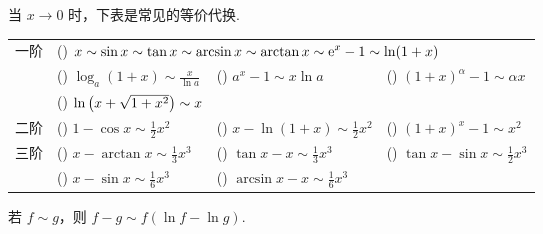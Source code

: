 当 $x\to0$ 时，下表是常见的等价代换.
\setcounter{magicrownumbers}{0}
\begin{table}[H]
    \centering
    \begin{tabular}{c l l l}
        \multirow{3}{*}{一阶} & \multicolumn{3}{l}{(\rownumber{}) $\displaystyle x\sim \sin x\sim \tan x\sim \arcsin x\sim \arctan x\sim \mathrm{e} ^x-1\sim \ln(1+x)$}                                                                                                                                                  \\
                              & (\rownumber{}) $\displaystyle \log_a(1+x)\sim\frac{x}{\ln a}$                                                                   & (\rownumber{}) $\displaystyle a^x-1\sim x\ln a$              & (\rownumber{}) $\displaystyle (1+x)^\alpha-1\sim \alpha x$                      \\
                              & (\rownumber{}) $\ln\qty(x+\sqrt{1+x^2})\sim x$                                                                                                                                                                                                                                   \\
        \midrule
        二阶                  & (\rownumber{}) $\displaystyle 1-\cos x\sim\frac{1}{2}x^2$                                                                       & (\rownumber{}) $\displaystyle x-\ln(1+x)\sim\frac{1}{2}x^2$  & (\rownumber{}) $\displaystyle (1+x)^x-1\sim x^2$                                \\
        \midrule
        \multirow{2}{*}{三阶} & (\rownumber{}) $\displaystyle x-\arctan x\sim\frac{1}{3}x^3$                                                                    & (\rownumber{}) $\displaystyle \tan x-x\sim\frac{1}{3}x^3$    & \multirow{2}{*}{(\rownumber{}) $\displaystyle \tan x-\sin x\sim\frac{1}{2}x^3$} \\
                              & (\rownumber{}) $\displaystyle x-\sin x\sim\frac{1}{6}x^3$                                                                       & (\rownumber{}) $\displaystyle \arcsin x-x\sim\frac{1}{6}x^3$ &                                                                                 \\
    \end{tabular}
\end{table}

\begin{theorem}[减法无穷小代换]
    若 $f\sim g$，则 $f-g\sim f(\ln f-\ln g)$.
    \label{fsimg}
\end{theorem}

